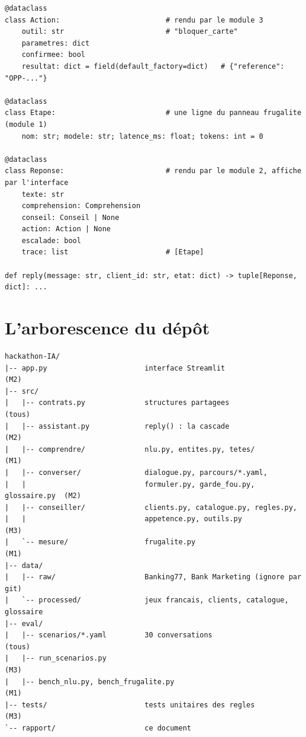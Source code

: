 \begin{code}
\begin{verbatim}
@dataclass
class Action:                         # rendu par le module 3
    outil: str                        # "bloquer_carte"
    parametres: dict
    confirmee: bool
    resultat: dict = field(default_factory=dict)   # {"reference": "OPP-..."}

@dataclass
class Etape:                          # une ligne du panneau frugalite (module 1)
    nom: str; modele: str; latence_ms: float; tokens: int = 0

@dataclass
class Reponse:                        # rendu par le module 2, affiche par l'interface
    texte: str
    comprehension: Comprehension
    conseil: Conseil | None
    action: Action | None
    escalade: bool
    trace: list                       # [Etape]

def reply(message: str, client_id: str, etat: dict) -> tuple[Reponse, dict]: ...
\end{verbatim}
\end{code}

\section{L'arborescence du dépôt}

\begin{code}
\footnotesize
\begin{verbatim}
hackathon-IA/
|-- app.py                       interface Streamlit                      (M2)
|-- src/
|   |-- contrats.py              structures partagees                     (tous)
|   |-- assistant.py             reply() : la cascade                     (M2)
|   |-- comprendre/              nlu.py, entites.py, tetes/               (M1)
|   |-- converser/               dialogue.py, parcours/*.yaml,
|   |                            formuler.py, garde_fou.py, glossaire.py  (M2)
|   |-- conseiller/              clients.py, catalogue.py, regles.py,
|   |                            appetence.py, outils.py                  (M3)
|   `-- mesure/                  frugalite.py                             (M1)
|-- data/
|   |-- raw/                     Banking77, Bank Marketing (ignore par git)
|   `-- processed/               jeux francais, clients, catalogue, glossaire
|-- eval/
|   |-- scenarios/*.yaml         30 conversations                         (tous)
|   |-- run_scenarios.py                                                  (M3)
|   |-- bench_nlu.py, bench_frugalite.py                                  (M1)
|-- tests/                       tests unitaires des regles               (M3)
`-- rapport/                     ce document
\end{verbatim}
\end{code}

